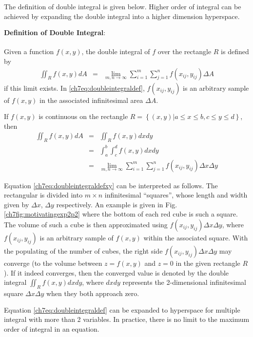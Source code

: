 The definition of double integral is given below. Higher order of integral can be achieved by expanding the double integral into a higher dimension hyperspace.

\begin{mdframed}
    \textbf{Definition of Double Integral}:
    \\
    \\
Given a function $f(x,y)$, the double integral of $f$ over the rectangle $R$ is defined by
\begin{eqnarray}
  \iint_{R} f(x,y)dA &=& \lim_{m, n\rightarrow \infty}\sum_{i=1}^{m} \sum_{j=1}^{n} f(x_{ij},y_{ij})\Delta A \label{ch7eq:doubleintegraldef}
\end{eqnarray}
if this limit exists. In \eqref{ch7eq:doubleintegraldef}, $f(x_{ij},y_{ij})$ is an arbitrary sample of $f(x,y)$ in the associated infinitesimal area $\Delta A$.

If $f(x,y)$ is continuous on the rectangle $R = \left\{(x,y)| a\leq x \leq b, c \leq y \leq d \right\}$, then
\begin{eqnarray}
  \iint_{R} f(x,y)dA &=& \iint_{R} f(x,y)dx dy \nonumber \\
  &=& \int_{a}^{b}\int_{c}^{d} f(x,y) dxdy \nonumber \\
  &=& \lim_{m, n\rightarrow \infty}\sum_{i=1}^{m} \sum_{j=1}^{n} f(x_{ij},y_{ij})\Delta x \Delta y \label{ch7eq:doubleintegraldefxy}
\end{eqnarray}

\end{mdframed}

Equation \eqref{ch7eq:doubleintegraldefxy} can be interpreted as follows. The rectangular is divided into $m\times n$ infinitesimal ``squares'', whose length and width given by $\Delta x$, $\Delta y$ respectively. An example is given in Fig. \ref{ch7fig:motivatingexp2p2} where the bottom of each red cube is such a square. The volume of such a cube is then approximated using $f(x_{ij},y_{ij})\Delta x \Delta y$, where $f(x_{ij},y_{ij})$ is an arbitrary sample of $f(x,y)$ within the associated square. With the populating of the number of cubes, the right side $f(x_{ij},y_{ij})\Delta x \Delta y$ may converge (to the volume between $z=f(x,y)$ and $z=0$ in the given rectangle $R$). If it indeed converges, then the converged value is denoted by the double integral $\iint_{R} f(x,y)dxdy$, where $dxdy$ represents the 2-dimensional infinitesimal square $\Delta x \Delta y$ when they both approach zero.

Equation \eqref{ch7eq:doubleintegraldef} can be expanded to hyperspace for multiple integral with more than 2 variables. In practice, there is no limit to the maximum order of integral in an equation. 